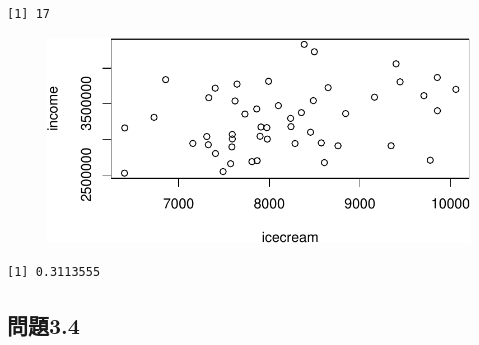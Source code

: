 \documentclass[
  letterpaper,
  DIV=11,
  numbers=noendperiod]{scrartcl}
\newenvironment{Shaded}{\begin{snugshade}}{\end{snugshade}}
\newcommand{\FunctionTok}[1]{\textcolor[rgb]{0.28,0.35,0.67}{#1}}
\newcommand{\NormalTok}[1]{\textcolor[rgb]{0.00,0.23,0.31}{#1}}
\newcommand{\SpecialCharTok}[1]{\textcolor[rgb]{0.37,0.37,0.37}{#1}}
\begin{document}
\begin{Shaded}
\end{Shaded}

\begin{verbatim}
[1] 17
\end{verbatim}

\begin{Shaded}
\end{Shaded}

\begin{figure}[H]

{\centering \includegraphics{ch3_files/figure-pdf/unnamed-chunk-9-1.pdf}

}

\end{figure}

\begin{Shaded}
\end{Shaded}

\begin{verbatim}
[1] 0.3113555
\end{verbatim}

\hypertarget{ux554fux984c3.4}{%
\subsection{問題3.4}\label{ux554fux984c3.4}}
\end{document}
